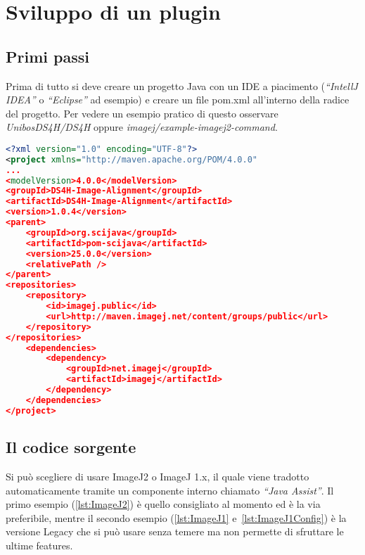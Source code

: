 \section{Sviluppo di un plugin}

\subsection{Primi passi}
\noindent Prima di tutto si deve creare un progetto Java con un IDE a piacimento (\textit{``IntellJ IDEA''} o \textit{``Eclipse''} ad esempio) e creare un file pom.xml all'interno della radice del progetto. Per vedere un esempio pratico di questo osservare \textit{UnibosDS4H/DS4H} oppure \textit{imagej/example-imagej2-command}.

\begin{minipage}{\linewidth}
\begin{lstlisting}[language=XML,caption={Esempio parziale di file pom.xml UnibosDS4H/DS4H su Github}, label={lst:pom}]
<?xml version="1.0" encoding="UTF-8"?>
<project xmlns="http://maven.apache.org/POM/4.0.0"
...
<modelVersion>4.0.0</modelVersion>
<groupId>DS4H-Image-Alignment</groupId>
<artifactId>DS4H-Image-Alignment</artifactId>
<version>1.0.4</version>
<parent>
    <groupId>org.scijava</groupId>
    <artifactId>pom-scijava</artifactId>
    <version>25.0.0</version>
    <relativePath />
</parent>
<repositories>
    <repository>
        <id>imagej.public</id>
        <url>http://maven.imagej.net/content/groups/public</url>
    </repository>
</repositories>
    <dependencies>
        <dependency>
            <groupId>net.imagej</groupId>
            <artifactId>imagej</artifactId>
        </dependency>
    </dependencies>
</project>
\end{lstlisting}
\end{minipage}

\subsection{Il codice sorgente}
\noindent Si può scegliere di usare ImageJ2 o ImageJ 1.x, il quale viene tradotto automaticamente tramite un componente interno chiamato \textit{``Java Assist''}. Il primo esempio (\ref{lst:ImageJ2}) è quello consigliato al momento ed è la via preferibile, mentre il secondo esempio (\ref{lst:ImageJ1} e~\ref{lst:ImageJ1Config}) è la versione Legacy che si può usare senza temere ma non permette di sfruttare le ultime features.



